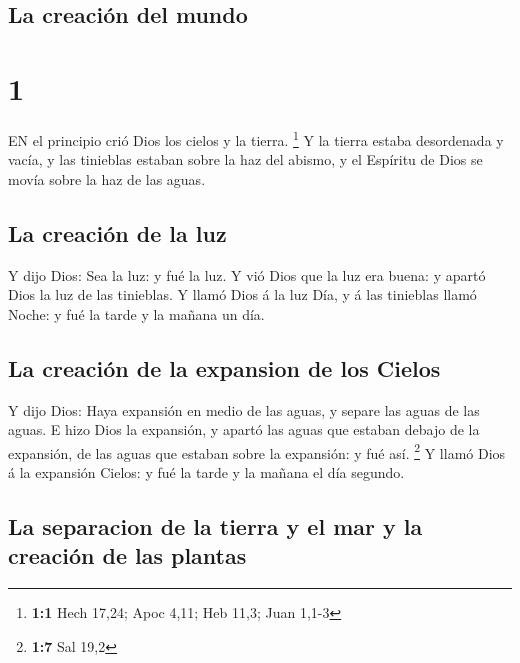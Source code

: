 \hypertarget{la-creaciuxf3n-del-mundo}{%
\subsection{La creación del mundo}\label{la-creaciuxf3n-del-mundo}}

\hypertarget{section}{%
\section{1}\label{section}}

 EN el principio crió Dios los cielos y la tierra.
\footnote{\textbf{1:1} Hech 17,24; Apoc 4,11; Heb 11,3; Juan 1,1-3}
 Y la tierra estaba desordenada y vacía, y las tinieblas
estaban sobre la haz del abismo, y el Espíritu de Dios se movía sobre la
haz de las aguas.

\hypertarget{la-creaciuxf3n-de-la-luz}{%
\subsection{La creación de la luz}\label{la-creaciuxf3n-de-la-luz}}

 Y dijo Dios: Sea la luz: y fué la luz.  Y vió
Dios que la luz era buena: y apartó Dios la luz de las tinieblas.
 Y llamó Dios á la luz Día, y á las tinieblas llamó Noche: y
fué la tarde y la mañana un día.

\hypertarget{la-creaciuxf3n-de-la-expansion-de-los-cielos}{%
\subsection{La creación de la expansion de los
Cielos}\label{la-creaciuxf3n-de-la-expansion-de-los-cielos}}

 Y dijo Dios: Haya expansión en medio de las aguas, y separe
las aguas de las aguas.  E hizo Dios la expansión, y apartó
las aguas que estaban debajo de la expansión, de las aguas que estaban
sobre la expansión: y fué así. \footnote{\textbf{1:7} Sal 19,2}
 Y llamó Dios á la expansión Cielos: y fué la tarde y la
mañana el día segundo.

\hypertarget{la-separacion-de-la-tierra-y-el-mar-y-la-creaciuxf3n-de-las-plantas}{%
\subsection{La separacion de la tierra y el mar y la creación de las
plantas}\label{la-separacion-de-la-tierra-y-el-mar-y-la-creaciuxf3n-de-las-plantas}}

